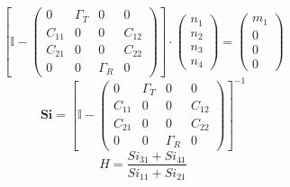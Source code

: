 \[ \left[ \mathbb{I}  - \left(\begin{smallmatrix} 0 & \Gamma_{T} & 0 &
0 \\ C_{11} & 0 & 0 & C_{12} \\ C_{21} & 0 & 0 & C_{22} \\ 0 & 0 &
\Gamma_{R} & 0 \end{smallmatrix}\right)\right] \cdot
\left(\begin{smallmatrix} n_{1} \\ n_{2} \\ n_{3} \\ n_{4}
\end{smallmatrix}\right) = \left(\begin{smallmatrix} m_{1} \\ 0 \\ 0
\\ 0 \end{smallmatrix}\right) \]
\[ \mathbf{Si} = \left[ \mathbb{I}  - \left(\begin{smallmatrix} 0 &
\Gamma_{T} & 0 & 0 \\ C_{11} & 0 & 0 & C_{12} \\ C_{21} & 0 & 0 &
C_{22} \\ 0 & 0 & \Gamma_{R} & 0 \end{smallmatrix}\right) \right]^{-1}
\]
\[ H = \frac{ Si_{31} + Si_{41} }{ Si_{11} + Si_{21} }  \]
